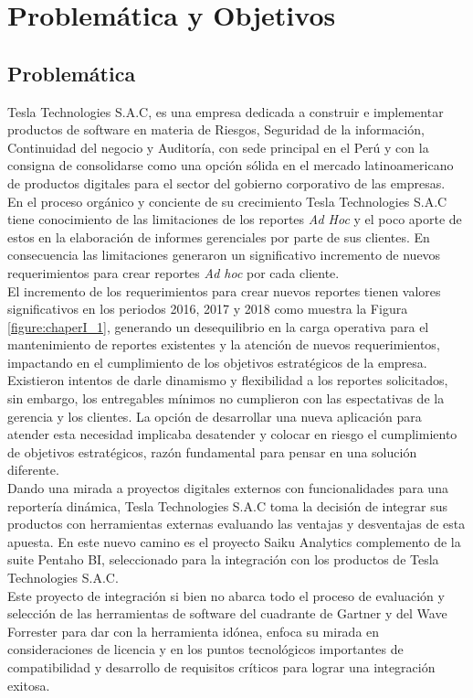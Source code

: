 \chapter{Problemática y Objetivos} \label{chapter:I}
\section{Problem\'{a}tica}
\begin{spacing}{1.5}	
	Tesla Technologies S.A.C, es una empresa dedicada a construir e implementar productos de software en materia de Riesgos, Seguridad de la información, Continuidad del negocio y Auditoría, con sede principal en el Perú y con la consigna de consolidarse como una opci\'{o}n s\'{o}lida en el mercado latinoamericano de productos digitales para el sector del gobierno corporativo de las empresas.\\	                         
	En el proceso org\'{a}nico y conciente de su crecimiento Tesla Technologies S.A.C tiene conocimiento de las limitaciones de los reportes \textit{Ad Hoc} y el poco aporte de estos en la elaboraci\'{o}n de informes gerenciales por parte de sus clientes. En consecuencia las limitaciones generaron un significativo incremento de nuevos requerimientos para crear reportes \textit{Ad hoc} por cada cliente.\\
	El incremento de los requerimientos para crear nuevos reportes tienen valores significativos en los periodos 2016, 2017 y 2018 como muestra la Figura \ref{figure:chaperI_1}, generando un desequilibrio en la carga operativa para el mantenimiento de reportes existentes y la atenci\'{o}n de nuevos requerimientos, impactando en el cumplimiento de los objetivos estrat\'{e}gicos de la empresa.\\
	Existieron intentos de darle dinamismo y flexibilidad a los reportes solicitados, sin embargo,  los entregables m\'{i}nimos no cumplieron con las espectativas de la gerencia y los clientes. La opci\'{o}n de desarrollar una nueva aplicaci\'{o}n para atender esta necesidad implicaba desatender y colocar en riesgo el cumplimiento de objetivos estrat\'{e}gicos, raz\'{o}n fundamental para pensar en una soluci\'{o}n diferente.\\
	Dando una mirada a proyectos digitales externos con funcionalidades para una reporter\'{i}a din\'{a}mica, Tesla Technologies S.A.C toma la decisi\'{o}n de integrar sus productos con herramientas externas evaluando las ventajas y desventajas de esta apuesta. En este nuevo camino es el proyecto Saiku Analytics complemento de la suite Pentaho BI, seleccionado para la integración con los productos de Tesla Technologies S.A.C.\\	
	Este proyecto de integraci\'{o}n si bien no abarca todo el proceso de evaluaci\'{o}n y selecci\'{o}n de  las herramientas de software del cuadrante de Gartner y del Wave Forrester para dar con la herramienta id\'{o}nea, enfoca su mirada en consideraciones de licencia y en los puntos tecnol\'{o}gicos importantes de compatibilidad y desarrollo de requisitos cr\'{i}ticos para lograr una integraci\'{o}n exitosa.\\
	

\end{spacing}
